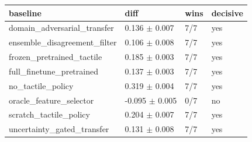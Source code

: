 \begin{tabular}{llll}
\toprule
baseline & diff & wins & decisive \\
\midrule
domain\_adversarial\_transfer & 0.136 $\pm$ 0.007 & 7/7 & yes \\
ensemble\_disagreement\_filter & 0.106 $\pm$ 0.008 & 7/7 & yes \\
frozen\_pretrained\_tactile & 0.185 $\pm$ 0.003 & 7/7 & yes \\
full\_finetune\_pretrained & 0.137 $\pm$ 0.003 & 7/7 & yes \\
no\_tactile\_policy & 0.319 $\pm$ 0.004 & 7/7 & yes \\
oracle\_feature\_selector & -0.095 $\pm$ 0.005 & 0/7 & no \\
scratch\_tactile\_policy & 0.204 $\pm$ 0.007 & 7/7 & yes \\
uncertainty\_gated\_transfer & 0.131 $\pm$ 0.008 & 7/7 & yes \\
\bottomrule
\end{tabular}
